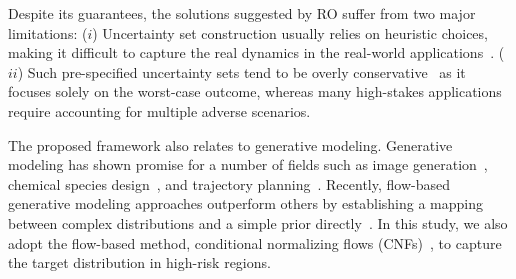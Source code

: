 Despite its guarantees, the solutions suggested by RO suffer from two major limitations: 
($i$) Uncertainty set construction usually relies on heuristic choices, making it difficult to capture the real dynamics in the real-world applications~\cite{10384836}.
($ii$) Such pre-specified uncertainty sets tend to be overly conservative~\cite{Roos2020ReducingConservatism} as it focuses solely on the worst-case outcome, whereas many high-stakes applications require accounting for multiple adverse scenarios.


The proposed framework also relates to generative modeling. Generative modeling has shown promise for a number of fields such as image generation~\cite{ho2020denoising}, chemical species design~\cite{anstine2023generative}, and trajectory planning~\cite{liang2024multi}. Recently, flow-based generative modeling approaches outperform others by establishing a mapping between complex distributions and a simple prior directly~\cite{lipman2022flow,zheng2023guided}. In this study, we also adopt the flow-based method, conditional normalizing flows (CNFs)~\cite{winkler2019learning}, to capture the target distribution in high-risk regions.